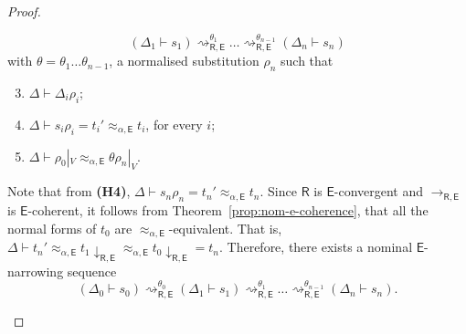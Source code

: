 \documentclass[11pt,a4paper]{amsart}
\newcommand{\ealeq}{\approx_{\alpha,\theory{E}}}
\newcommand{\alert}[1]{\textcolor{red}{#1}}
\newcommand{\theory}[1]{\ensuremath{\mathsf{#1}}}
\theoremstyle{plain}
\theoremstyle{definition}
\theoremstyle{remark}
\begin{document}
\begin{proof}
\begin{itemize}
    $$ (\Delta_1 \vdash s_1) \rightsquigarrow^{\theta_1}_{\theory{R,E}}  \ldots \rightsquigarrow^{\theta_{n-1}}_{\theory{R,E}} (\Delta_n \vdash s_n) $$
    with $\theta=\theta_1\ldots \theta_{n-1}$, a normalised substitution $\rho_n$ such that 
   \begin{enumerate}[{\bf (H1)}] 
   \setcounter{enumi}{2}
   \item $\Delta\vdash \Delta_i\rho_i$;
   \item  $\Delta \vdash s_i\rho_i =t_i'\ealeq t_i$, for every $i$; 
   \item $\Delta \vdash \rho_0|_V \ealeq \theta\rho_n|_V$. 
   \end{enumerate} 
   Note that from {\bf (H4)}, $\Delta\vdash s_n\rho_n=t_n'\ealeq t_n$. Since \theory{R} is \theory{E}-convergent and $\to_{\theory{R,E}}$ is \theory{E}-coherent, it follows from Theorem~\ref{prop:nom-e-coherence}, that all the normal forms  of $t_0$ are $\ealeq$-equivalent. That is, 
   $\Delta\vdash t_n'\ealeq t_1\downarrow_\theory{R,E}\ealeq t_0\downarrow_\theory{R,E}=t_n.$
    Therefore, there exists  a nominal \theory{E}-narrowing sequence
  $$(\Delta_0\vdash s_0) \rightsquigarrow^{\theta_0}_{\theory{R,E}} (\Delta_1 \vdash s_1) \rightsquigarrow^{\theta_1}_{\theory{R,E}}  \ldots \rightsquigarrow^{\theta_{n-1}}_{\theory{R,E}} (\Delta_n \vdash s_n).$$
\end{itemize}

    

\end{proof}
\end{document}
